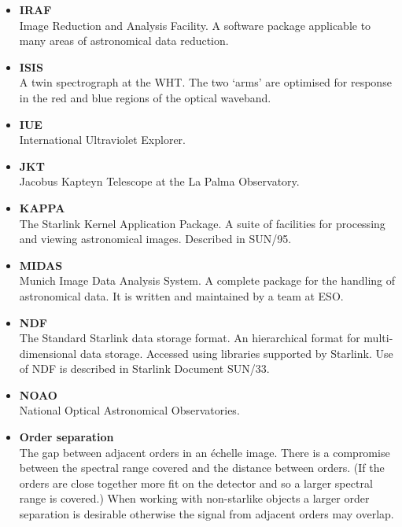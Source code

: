 \documentclass[twoside,11pt]{article}
\newcommand{\xref}[3]{#1}
\begin{document}
\begin{itemize}
\item {\bf\label{gl_iraf}IRAF}\\
      Image Reduction and Analysis Facility.  A software package
      applicable to many areas of astronomical data reduction.

\item {\bf\label{gl_isis}ISIS}\\
      A twin spectrograph at the WHT.  The two `arms' are optimised
      for response in the red and blue regions of the optical waveband.

\item {\bf\label{gl_iue}IUE}\\
      International Ultraviolet Explorer.

\item {\bf\label{gl_jkt}JKT}\\
      Jacobus Kapteyn Telescope at the La Palma Observatory.

\item {\bf\label{gl_kappa}KAPPA}\\
      The Starlink Kernel Application Package.  A suite of facilities
      for processing and viewing astronomical images.
      Described in \xref{SUN/95}{sun95}{}.

\item {\bf\label{gl_midas}MIDAS}\\
      Munich Image Data Analysis System.  A complete package for the
      handling of astronomical data.
      It is written and maintained by a team at ESO.

\item {\bf\label{gl_ndf}NDF}\\
      The Standard Starlink data storage format.  An hierarchical format for
      multi-dimensional data storage.  Accessed using libraries supported
      by Starlink.  Use of NDF is described in Starlink Document
      \xref{SUN/33}{sun33}{}\cite{ndf}.

\item {\bf\label{gl_noao}NOAO}\\
      National Optical Astronomical Observatories.

\item {\bf\label{gl_order_separation}Order separation}\\
      The gap between adjacent orders in an \'{e}chelle image.
      There is a compromise between the spectral range covered and the
      distance between orders.  (If the orders are close together more fit
      on the detector and so a larger spectral range is covered.)
      When working with non-starlike objects a larger order separation
      is desirable otherwise the signal from adjacent orders may overlap.


\end{itemize}
\end{document}
